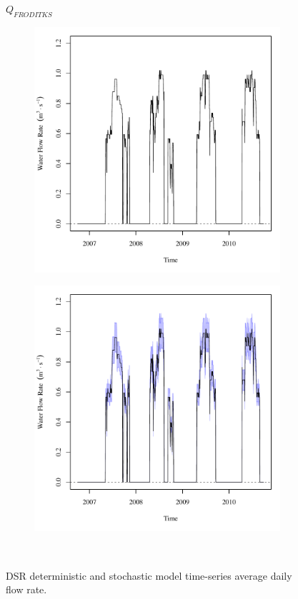 \subfiguremid
\begin{landscape}
	\begin{figure}
		\centering
		$ Q_{FRODITKS} $
		\begin{subfigure}{0.7\textwidth}
			\centering
			\includegraphics[width=\tableCustomSize]{"Figures/Results_DSR/Deterministic/Q FRO"}
		\end{subfigure}%
		\begin{subfigure}{0.7\textwidth}
			\centering
			\includegraphics[width=\tableCustomSize]{"Figures/Results_DSR/Stochastic/Q FRO"}
		\end{subfigure}\\
		\caption{DSR deterministic and stochastic model time-series average daily flow rate.}
	\end{figure}
\end{landscape}

